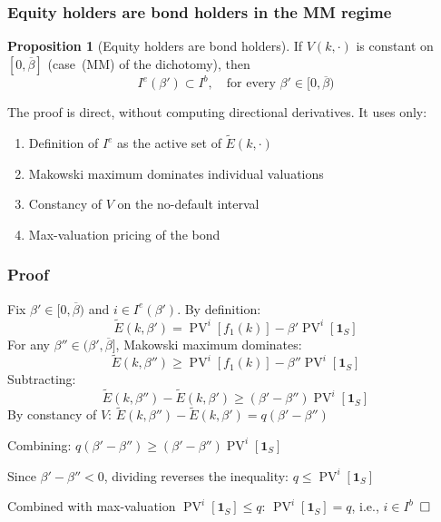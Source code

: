 \documentclass[blue]{beamer}
\DeclareMathOperator\PV{PV}
\def\1{\mathbf{1}}
\def\leq{\leqslant}
\def\geq{\geqslant}
\def\boite{\hskip 0.5mm {\Box} \hskip 0.5mm}
\theoremstyle{definition}
\theoremstyle{example}
\newtheorem*{proposition}{Proposition}
\begin{document}
\begin{frame}\frametitle{Equity holders are bond holders in the MM regime}
\begin{proposition}[Equity holders are bond holders]
If $V(k, \cdot)$ is constant on $[0, \overline{\beta}]$ \textup{(}case~\textup{(MM)} of the dichotomy\textup{)}, then
\[
I^e(\beta') \subset I^b, \quad \text{for every $\beta' \in [0, \overline{\beta})$}
\]
\end{proposition}
\bigskip

The proof is \alert{direct}, without computing directional derivatives. It uses only:
\begin{enumerate}
\item Definition of $I^e$ as the active set of $\widetilde{E}(k, \cdot)$
\item Makowski maximum dominates individual valuations
\item Constancy of $V$ on the no-default interval
\item Max-valuation pricing of the bond
\end{enumerate}
\end{frame}
\begin{frame}\frametitle{Proof}
Fix $\beta' \in [0, \overline{\beta})$ and $i \in I^e(\beta')$. By definition:
\[
\widetilde{E}(k, \beta') = \PV^i[f_1(k)] - \beta' \PV^i[\1_S]
\]
For any $\beta'' \in (\beta', \overline{\beta}]$, Makowski maximum dominates:
\[
\widetilde{E}(k, \beta'') \geq \PV^i[f_1(k)] - \beta'' \PV^i[\1_S]
\]
Subtracting:
\[
\widetilde{E}(k, \beta'') - \widetilde{E}(k, \beta') \geq (\beta' - \beta'') \PV^i[\1_S]
\]
By constancy of $V$: \quad $\widetilde{E}(k, \beta'') - \widetilde{E}(k, \beta') = q(\beta' - \beta'')$
\bigskip

Combining: \quad $q(\beta' - \beta'') \geq (\beta' - \beta'') \PV^i[\1_S]$
\bigskip

Since $\beta' - \beta'' < 0$, dividing reverses the inequality: $q \leq \PV^i[\1_S]$
\bigskip

Combined with max-valuation $\PV^i[\1_S] \leq q$: \quad $\PV^i[\1_S] = q$, i.e., $i \in I^b$ \alert{$\boite$}
\end{frame}
\end{document}
